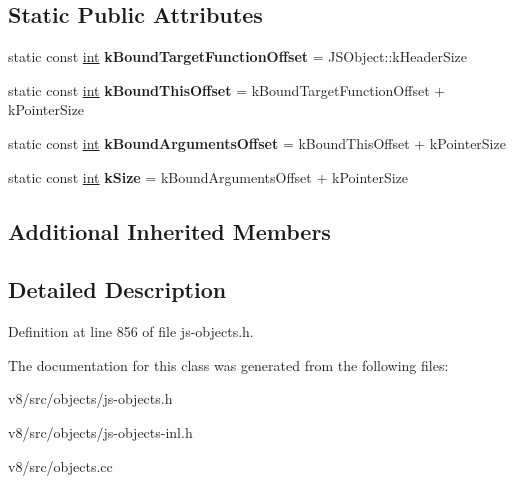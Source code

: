 \subsection*{Static Public Attributes}
\begin{DoxyCompactItemize}
\item 
\mbox{\label{classv8_1_1internal_1_1JSBoundFunction_a62d0e4a5d1205ca5db1560e9a5672a83}} 
static const \mbox{\hyperlink{classint}{int}} {\bfseries k\+Bound\+Target\+Function\+Offset} = J\+S\+Object\+::k\+Header\+Size
\item 
\mbox{\label{classv8_1_1internal_1_1JSBoundFunction_a9ffc641da476a34eb80b3fdfbb3847b3}} 
static const \mbox{\hyperlink{classint}{int}} {\bfseries k\+Bound\+This\+Offset} = k\+Bound\+Target\+Function\+Offset + k\+Pointer\+Size
\item 
\mbox{\label{classv8_1_1internal_1_1JSBoundFunction_a16d857627dcbec39f014440c076a2e0b}} 
static const \mbox{\hyperlink{classint}{int}} {\bfseries k\+Bound\+Arguments\+Offset} = k\+Bound\+This\+Offset + k\+Pointer\+Size
\item 
\mbox{\label{classv8_1_1internal_1_1JSBoundFunction_aeebf3de5eb07077231f3dda43c17354f}} 
static const \mbox{\hyperlink{classint}{int}} {\bfseries k\+Size} = k\+Bound\+Arguments\+Offset + k\+Pointer\+Size
\end{DoxyCompactItemize}
\subsection*{Additional Inherited Members}


\subsection{Detailed Description}


Definition at line 856 of file js-\/objects.\+h.



The documentation for this class was generated from the following files\+:\begin{DoxyCompactItemize}
\item 
v8/src/objects/js-\/objects.\+h\item 
v8/src/objects/js-\/objects-\/inl.\+h\item 
v8/src/objects.\+cc\end{DoxyCompactItemize}
